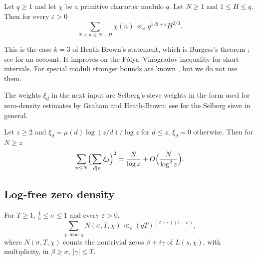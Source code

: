 \documentclass[11pt]{amsart}
\numberwithin{equation}{section}
\theoremstyle{plain}
\theoremstyle{definition}
\theoremstyle{remark}
\newcommand{\eps}{\varepsilon}
\newcommand{\1}{\mathbf{1}}
\begin{document}
\begin{inp}[Burgess {\cite[Lemma~2.1]{HeathBrown1992zero}, $k=3$}]\label{inp:burgess}
Let $q\ge1$ and let $\chi$ be a primitive character modulo $q$. Let $N\ge1$ and $1\le H\le q$. Then
for every $\eps>0$
\[
  \sum_{N<n\le N+H}\chi(n)\ll_\eps q^{1/9+\eps}H^{2/3}.
\]
\end{inp}

This is the case $k=3$ of Heath-Brown's statement, which is Burgess's theorem
\cite{Burgess1962primitive,Burgess1962character,Burgess1963character,Burgess1986character}; see
\cite{HeathBrown2013burgess} for an account. It improves on the P\'olya--Vinogradov inequality
\cite{Polya1918verteilung,Vinogradov1918distribution} for short intervals. For special moduli stronger
bounds are known \cite{BarbanLinnikChudakov1964prime,Chang2014short,BanksShparlinski2019bounds,
Kerr2019moments,PetrowYoung2020weyl}, but we do not use them.

The weights $\xi_d$ in the next input are Selberg's sieve weights
\cite{Selberg1947elementary,Selberg1991lectures} in the form used for zero-density estimates by Graham
and Heath-Brown; see \cite{HalberstamRichert1974sieve,Motohashi1983lectures,FriedlanderIwaniec2010opera}
for the Selberg sieve in general.

\begin{inp}\label{inp:graham}
Let $z\ge2$ and $\xi_d=\mu(d)\log(z/d)/\log z$ for $d\le z$, $\xi_d=0$ otherwise. Then for $N\ge z$
\[
  \sum_{n\le N}\Bigl(\sum_{d\mid n}\xi_d\Bigr)^2=\frac N{\log z}+O\Bigl(\frac N{\log^2z}\Bigr).
\]
\end{inp}

\subsection{Log-free zero density}

\begin{inp}\label{inp:logfree}
For $T\ge1$, $\frac45\le\sigma\le1$ and every $\eps>0$,
\[
  \sum_{\chi\bmod q}N(\sigma,T,\chi)\ll_\eps(qT)^{(2+\eps)(1-\sigma)},
\]
where $N(\sigma,T,\chi)$ counts the nontrivial zeros $\beta+i\gamma$ of $L(s,\chi)$, with multiplicity, in
$\beta\ge\sigma$, $|\gamma|\le T$.
\end{inp}
\end{document}
